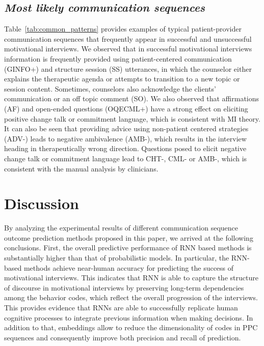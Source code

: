 \documentclass{amia_summit_2018}
\begin{document}
\subsection*{\textit{Most likely communication sequences}}
Table~\ref{tab:common_patterns} provides examples of typical patient-provider communication sequences that frequently appear in successful and unsuccessful motivational interviews. We observed that in successful motivational interviews information is frequently provided using patient-centered communication (GINFO+) and structure session (SS) utterances, in which the counselor either explains the therapeutic agenda or attempts to transition to a new topic or session content. Sometimes, counselors also acknowledge the clients' communication or an off topic comment (SO). We also observed that affirmations (AF) and open-ended questions (OQECML+) have a strong effect on eliciting positive change talk or commitment language, which is consistent with MI theory. It can also be seen that providing advice using non-patient centered strategies (ADV-) leads to negative ambivalence (AMB-), which results in the interview heading in therapeutically wrong direction. Questions posed to elicit negative change talk or commitment language lead to CHT-, CML- or AMB-, which is  consistent with the manual analysis by clinicians.

\section*{Discussion}
By analyzing the experimental results of different communication sequence outcome prediction methods proposed in this paper, we arrived at the following conclusions. First, the overall predictive performance of RNN based methods is substantially higher than that of probabilistic models. In particular, the RNN-based methods achieve near-human accuracy for predicting the success of motivational interviews. This indicates that RNN is able to capture the structure of discourse in motivational interviews by preserving long-term dependencies among the behavior codes, which reflect the overall progression of the interviews. This provides evidence that RNNs are able to successfully replicate human cognitive processes to integrate previous information when making decisions. In addition to that, embeddings allow to reduce the dimensionality of codes in PPC sequences and consequently improve both precision and recall of  prediction.
\end{document}
